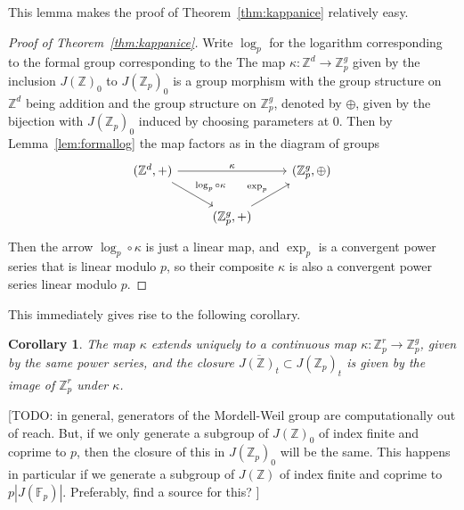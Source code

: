 \documentclass{article}
\newcommand{\Z}{\mathbb{Z}}
\newcommand{\F}{\mathbb{F}}
\theoremstyle{plain}
\newtheorem{cor}[thm]{Corollary} %
\theoremstyle{definition}
\theoremstyle{remark}
\begin{document}
This lemma makes the proof of Theorem~\ref{thm:kappanice} relatively easy. 
\begin{proof}[Proof of Theorem~\ref{thm:kappanice}]
Write $\log_p$ for the logarithm corresponding to the formal group corresponding to the The map $\kappa: \Z^d \to \Z_p^g$ given by the inclusion $J(\Z)_0$ to $J(\Z_p)_0$ is a group morphism with the group structure on $\Z^d$ being addition and the group structure on $\Z_p^g$, denoted by $\oplus$, given by the bijection with $J(\Z_p)_0$ induced by choosing parameters at $0$. Then by Lemma~\ref{lem:formallog} the map factors as in the diagram of groups
\[
\begin{tikzcd}
{(\Z^d,+)} \arrow[rr, "\kappa"] \arrow[rd, "\log_p \circ \kappa"] &                                   & {(\Z_p^g,\oplus)} \\
                                                                  & {(\Z_p^g,+)} \arrow[ru, "\exp_p"] &                  
\end{tikzcd}
\]
Then the arrow $\log_p \circ \kappa$ is just a linear map, and $\exp_p$ is a convergent power series that is linear modulo $p$, so their composite $\kappa$ is also a convergent power series linear modulo $p$.
\end{proof}

This immediately gives rise to the following corollary.
\begin{cor}
\label{cor:closurejac}
The map $\kappa$ extends uniquely to a continuous map $\kappa: \Z_p^r \to \Z_p^g$, given by the same power series, and the closure $\overline{J(\Z)_t} \subset J(\Z_p)_t$ is given by the image of $\Z_p^r$ under $\kappa$.
\end{cor}

[TODO: in general, generators of the Mordell-Weil group are computationally out of reach. But, if we only generate a subgroup of $J(\Z)_0$ of index finite and coprime to $p$, then the closure of this in $J(\Z_p)_0$ will be the same. This happens in particular if we generate a subgroup of $J(\Z)$ of index finite and coprime to $p|J(\F_p)|$. Preferably, find a source for this? ]
\end{document}
